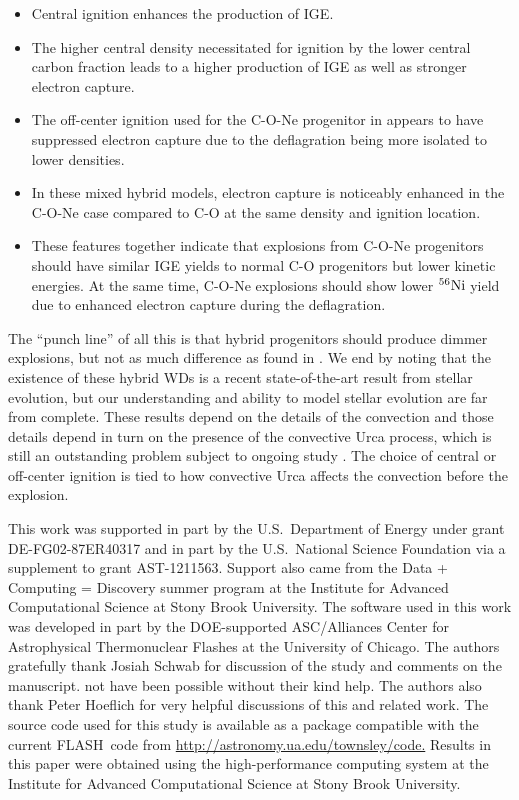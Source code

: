 \documentclass[preprint2]{aastex63}
\newcommand{\Ni}[1]{\ensuremath{{}^{#1}{\rm Ni}}}
\newcommand{\code}[1]{\textsc{#1}}
\newcommand{\FLASH}{\code{FLASH}}
\begin{document}
\begin{itemize}

\item
Central ignition enhances the production of IGE.

\item
The higher central density necessitated for ignition by the lower central carbon fraction leads to a higher production of IGE as well as stronger electron capture.

\item
The off-center ignition used for the C-O-Ne progenitor in \citet{willcoxetal2016} appears to have suppressed electron capture due to the deflagration being more isolated to lower densities.

\item
In these mixed hybrid models, electron capture is noticeably enhanced in the C-O-Ne case compared to C-O at the same density and ignition location.

\item
These features together indicate that explosions from C-O-Ne progenitors should have similar IGE yields to normal C-O progenitors but lower kinetic energies.
At the same time, C-O-Ne explosions should show lower \Ni{56} yield due to enhanced electron capture during the deflagration.

\end{itemize}

The ``punch line'' of all this is that hybrid progenitors should produce dimmer
explosions, but not as much difference as found in \citet{willcoxetal2016}.
We end by noting that the existence of these hybrid
WDs is a recent state-of-the-art result from stellar evolution, but our understanding 
and ability to model stellar evolution are far from complete. These results depend
on the details of the convection and those details depend in turn on the
presence of the convective Urca process, which is still an outstanding problem 
subject to ongoing study \citep{calderetal2019,willcoxetal2019}.
The choice of central or off-center ignition is tied to how convective Urca affects the convection before the explosion.

\acknowledgements

This work was supported in part by the U.S.\ Department of Energy under
grant DE-FG02-87ER40317 and in part by the U.S.\ National Science Foundation
via a supplement to grant AST-1211563.
Support also came from the Data + Computing = Discovery summer program at
the Institute for Advanced Computational Science at Stony Brook University.
The software used in this work was developed in part by the DOE-supported
ASC/Alliances Center for Astrophysical Thermonuclear Flashes at the
University of Chicago. The authors gratefully thank Josiah 
Schwab for discussion of the study and comments on the manuscript.
not have been possible without their kind help. The authors also
thank Peter Hoeflich for very helpful discussions of this and related work. 
The source code used for
this study is available as a package compatible with the
current \FLASH\ code from \url{http://astronomy.ua.edu/townsley/code.}
Results in this
paper were obtained using the high-performance computing system at the
Institute for Advanced Computational Science at Stony Brook
University.
\end{document}
